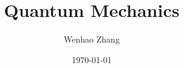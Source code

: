 \documentclass{article}
\begin{document}
\title{Quantum Mechanics}
\author{Wenhao Zhang}
\date{\today}
\maketitle

\tableofcontents
\newpage





\end{document}
